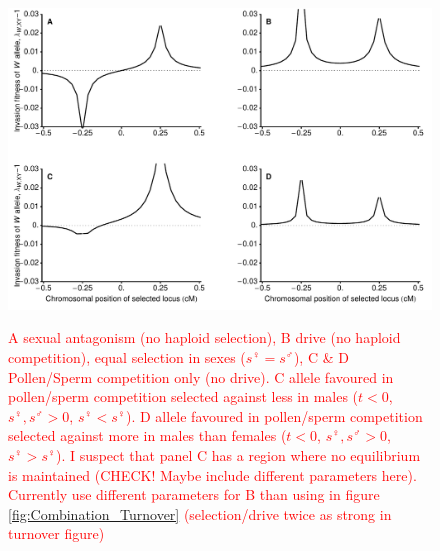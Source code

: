 \documentclass[12pt]{article}
\begin{document}
\begin{figure}
\centering
\includegraphics[width=\linewidth]{Combination_Centimorgan}\\
\caption{
\textcolor{red}{A sexual antagonism (no haploid selection), B drive (no haploid competition), equal selection in sexes ($s^\female=s^\male$), C \& D Pollen/Sperm competition only (no drive). C allele favoured in pollen/sperm competition selected against less in males ($t<0$, $s^\female, s^\male >0$, $s^\female<s^\female$). D allele favoured in pollen/sperm competition selected against more in males than females ($t<0$, $s^\female, s^\male >0$, $s^\female>s^\female$). I suspect that panel C has a region where no equilibrium is maintained (CHECK! Maybe include different parameters here). Currently use different parameters for B than using in figure \ref{fig:Combination_Turnover} (selection/drive twice as strong in turnover figure)}
}
\label{fig:Combination_Centimorgans}
\end{figure}
\newpage


\end{document}
